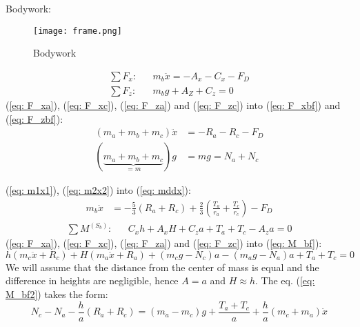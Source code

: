 Bodywork:
\begin{multicols}{2}
	\begin{figure}[H]
		\begin{center}
			\texttt{[image: frame.png]}
		\end{center}
		\caption{Bodywork}
	\end{figure}
	\begin{align} \label{eq: F_xbf}
	    \sum F_x: && m_b\ddot x = -A_x - C_x - F_D \\ \label{eq: F_zbf}
    	\sum F_z: && m_bg + A_Z +C_z = 0
	\end{align}
	(\ref{eq: F_xa}), (\ref{eq: F_xc}), (\ref{eq: F_za}) and (\ref{eq: F_zc}) into (\ref{eq: F_xbf}) and (\ref{eq: F_zbf}):
	\begin{align} \label{eq: mddx}
	    \left(m_a + m_b + m_c\right)\ddot x & = -R_a - R_c - F_D\\\label{eq: mgNaNc} 
    	(\underbrace{m_a + m_b + m_c}_{=m})g & = mg = N_a + N_c
	\end{align}
\end{multicols}
(\ref{eq: m1x1}), (\ref{eq: m2x2}) into (\ref{eq: mddx}):
\begin{align}
    m_b\ddot x &= -\frac{5}{3}\left(R_a+R_c\right) + \frac{2}{3}\left(\frac{T_a}{r_a} + \frac{T_c}{r_c}\right)- F_D
\end{align}
\begin{align}\label{eq: M_bf}
	\sum M^{(S_b)}: && C_xh + A_xH + C_za + T_a + T_c - A_za = 0
\end{align}
(\ref{eq: F_xa}), (\ref{eq: F_xc}), (\ref{eq: F_za}) and (\ref{eq: F_zc}) into (\ref{eq: M_bf}):
\begin{equation} \label{eq: M_bf2}
	h(m_c\ddot x + R_c) + H(m_a\ddot x+R_a) + (m_cg-N_c)a - (m_ag-N_a)a + T_a+T_c = 0
\end{equation}
We will assume that the distance from the center of mass is equal and the  difference in heights are negligible, hence $A=a$ and $H\approx h$. The eq. (\ref{eq: M_bf2}) takes the form:
\begin{equation} \label{eq: M_bf3}
	N_c - N_a -\frac{h}{a}(R_a+R_c) = (m_a - m_c)g + \frac{T_a+T_c}{a} + \frac{h}{a}(m_c+m_a)\ddot x
\end{equation}

